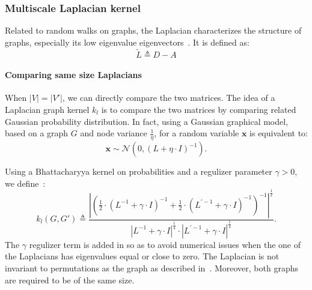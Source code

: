         \subsubsection{Multiscale Laplacian kernel}
            Related to random walks on graphs, the Laplacian characterizes the structure of graphs, especially its low eigenvalue eigenvectors~\parencite{kondor2016multiscale}.
            It is defined as:
            \begin{equation}
                \label{eq::laplacian_graph}
                \widetilde{L} \triangleq D - A
            \end{equation}

            \paragraph{Comparing same size Laplacians}
                When $\vert V \vert = \vert V' \vert$, we can directly compare the two matrices.
                The idea of a Laplacian graph kernel $k_{l}$ is to compare the two matrices by comparing related Gaussian probability distribution.
                In fact, using a Gaussian graphical model, based on a graph $G$ and node variance $\frac{1}{\eta}$, for a random variable $\bm{x}$ is equivalent to:
                \begin{equation}
                    \label{eq::guassian_gm}
                    \bm{x} \sim \mathscr{N}\left(0, \left(L + \eta \cdot I\right)^{-1}\right).
                \end{equation}

                Using a Bhattacharyya kernel on probabilities and a regulizer parameter $\gamma>0$, we define~\parencite{kondor2016multiscale}:
                \begin{equation}
                    \label{eq::laplacian_kernel}
                    k_{l}(G, G') \triangleq \frac{\left\lvert \left(\frac{1}{2} \cdot \left(L^{-1}+\gamma\cdot I\right)^{-1} + \frac{1}{2} \cdot \left(L^{\prime -1}+\gamma\cdot I\right)^{-1} \right)^{-1} \right\rvert^{\frac{1}{2}}}{\left\lvert L^{-1} + \gamma \cdot I\right\rvert^{\frac{1}{4}}\cdot\left\lvert L^{\prime -1} + \gamma \cdot I\right\rvert^{\frac{1}{4}}}.
                \end{equation}
                The \(\gamma\) regulizer term is added in so as to avoid numerical issues when the one of the Laplacians has eigenvalues equal or close to zero.
                The Laplacian is not invariant to permutations as the graph as described in~\textcite{kondor2016multiscale}.
                Moreover, both graphs are required to be of the same size.\\

